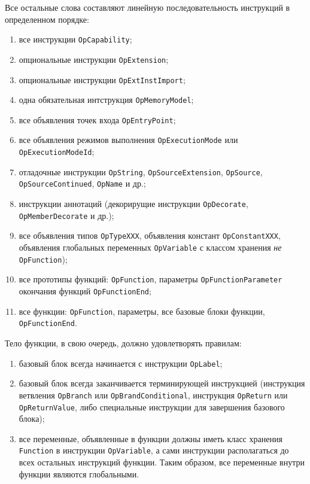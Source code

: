 \documentclass[14pt]{extarticle}
\begin{document}
Все остальные слова составляют линейную последовательность инструкций в определенном порядке:
\begin{enumerate}
	\item все инструкции \texttt{OpCapability};

    \item опциональные инструкции \texttt{OpExtension};

    \item опциональные инструкции \texttt{OpExtInstImport};

    \item одна обязательная интструкция \texttt{OpMemoryModel};

    \item все объявления точек входа \texttt{OpEntryPoint};
    
    \item все объявления режимов выполнения \texttt{OpExecutionMode} или \texttt{OpExecutionModeId};
    
    \item отладочные инструкции \texttt{OpString}, \texttt{OpSourceExtension}, \texttt{OpSource},\\
    \texttt{OpSourceContinued}, \texttt{OpName} и др.;
    
    \item инструкции аннотаций (декорирущие инструкции \texttt{OpDecorate},\\
    \texttt{OpMemberDecorate} и др.);
    
    \item все объявления типов \texttt{OpTypeXXX}, объявления констант \texttt{OpConstantXXX}, объявления глобальных переменных \texttt{OpVariable} с классом хранения \emph{не} \texttt{OpFunction});
    
    \item все прототипы функций: \texttt{OpFunction}, параметры  \texttt{OpFunctionParameter} окончания функций \texttt{OpFunctionEnd};
    
    \item все функции: \texttt{OpFunction}, параметры, все базовые блоки функции,\\
    \texttt{OpFunctionEnd}.
\end{enumerate}

Тело функции, в свою очередь, должно удовлетворять правилам:
\begin{enumerate}
	\item базовый блок всегда начинается с инструкции \texttt{OpLabel};
	
	\item базовый блок всегда заканчивается терминирующей инструкцией (инструкция ветвления \texttt{OpBranch} или \texttt{OpBrandConditional}, инструкция \texttt{OpReturn} или\\
	\texttt{OpReturnValue}, либо специальные инструкции для завершения базового блока);
	
	\item все переменные, объявленные в функции должны иметь класс хранения	\texttt{Function} в инструкции \texttt{OpVariable}, а сами инструкции располагаться до всех остальных инструкций функции. Таким образом, все переменные внутри функции являются глобальными.
\end{enumerate}
\end{document}
